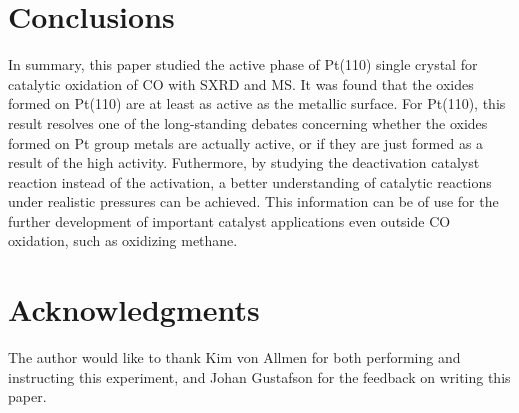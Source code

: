 \documentclass[aps,prl,groupedaddress,twocolumn]{revtex4-1}
\begin{document}
\section{Conclusions}
In summary, this paper studied the active phase of Pt(110) single crystal for catalytic oxidation of CO with SXRD and MS. It was found that the oxides formed on Pt(110) are at least as active as the metallic surface. For Pt(110), this result resolves one of the long-standing debates concerning whether the oxides formed on Pt group metals are actually active, or if they are just formed as a result of the high activity. Futhermore, by studying the deactivation catalyst reaction instead of the activation, a better understanding of catalytic reactions under realistic pressures can be achieved. This information can be of use for the further development of important catalyst applications even outside CO oxidation, such as oxidizing methane.



\section{Acknowledgments}
The author would like to thank Kim von Allmen for both performing and instructing this experiment, and Johan Gustafson for the feedback on writing this paper.






\end{document}
